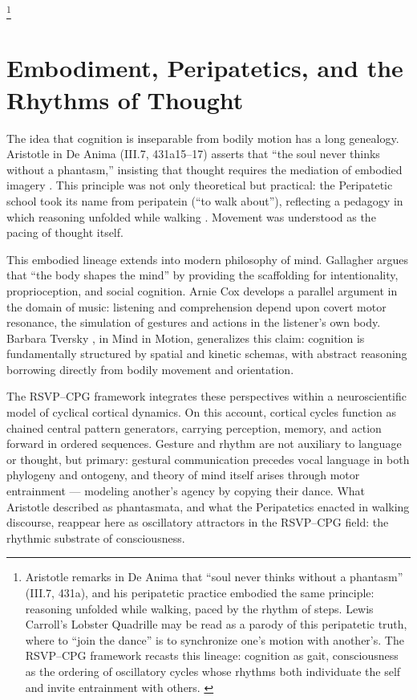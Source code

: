 \documentclass{article}
\begin{document}
\footnote{Aristotle remarks in De Anima that “soul never thinks without a phantasm” (III.7, 431a), and his peripatetic practice embodied the same principle: reasoning unfolded while walking, paced by the rhythm of steps. Lewis Carroll’s Lobster Quadrille may be read as a parody of this peripatetic truth, where to “join the dance” is to synchronize one’s motion with another’s. The RSVP–CPG framework recasts this lineage: cognition as gait, consciousness as the ordering of oscillatory cycles whose rhythms both individuate the self and invite entrainment with others. \citep{aristotle1984complete, during1957aristotle}}

\section{Embodiment, Peripatetics, and the Rhythms of Thought}

The idea that cognition is inseparable from bodily motion has a long genealogy. Aristotle in De Anima (III.7, 431a15–17) asserts that “the soul never thinks without a phantasm,” insisting that thought requires the mediation of embodied imagery \citep{aristotle1984complete}. This principle was not only theoretical but practical: the Peripatetic school took its name from peripatein (“to walk about”), reflecting a pedagogy in which reasoning unfolded while walking \citep{during1957aristotle}. Movement was understood as the pacing of thought itself.

This embodied lineage extends into modern philosophy of mind. Gallagher \citep{gallagher2005body} argues that “the body shapes the mind” by providing the scaffolding for intentionality, proprioception, and social cognition. Arnie Cox \citep{cox2016music} develops a parallel argument in the domain of music: listening and comprehension depend upon covert motor resonance, the simulation of gestures and actions in the listener’s own body. Barbara Tversky \citep{tversky2019mind}, in Mind in Motion, generalizes this claim: cognition is fundamentally structured by spatial and kinetic schemas, with abstract reasoning borrowing directly from bodily movement and orientation.

The RSVP--CPG framework integrates these perspectives within a neuroscientific model of cyclical cortical dynamics. On this account, cortical cycles function as chained central pattern generators, carrying perception, memory, and action forward in ordered sequences. Gesture and rhythm are not auxiliary to language or thought, but primary: gestural communication precedes vocal language in both phylogeny and ontogeny, and theory of mind itself arises through motor entrainment — modeling another’s agency by copying their dance. What Aristotle described as phantasmata, and what the Peripatetics enacted in walking discourse, reappear here as oscillatory attractors in the RSVP--CPG field: the rhythmic substrate of consciousness.
\end{document}

